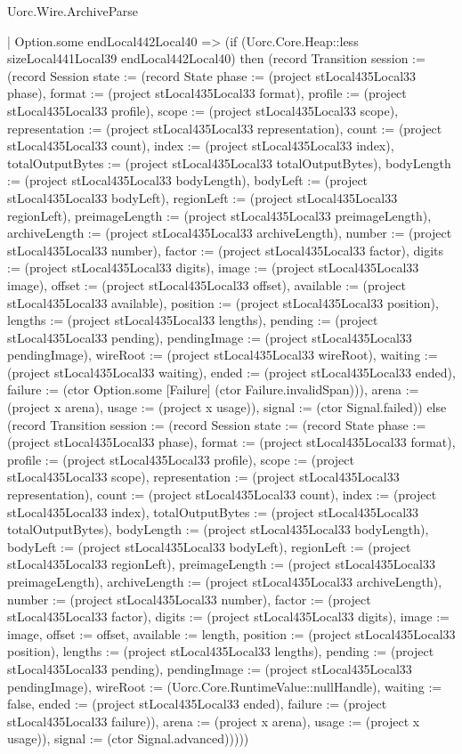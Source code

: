\begin{lexlean}{Uorc.Wire.ArchiveParse}
\begin{semanticmodule}
{            | Option.some endLocal442Local40 => (if (Uorc.Core.Heap::less sizeLocal441Local39 endLocal442Local40) then (record Transition {session := (record Session {state := (record State {phase := (project stLocal435Local33 phase), format := (project stLocal435Local33 format), profile := (project stLocal435Local33 profile), scope := (project stLocal435Local33 scope), representation := (project stLocal435Local33 representation), count := (project stLocal435Local33 count), index := (project stLocal435Local33 index), totalOutputBytes := (project stLocal435Local33 totalOutputBytes), bodyLength := (project stLocal435Local33 bodyLength), bodyLeft := (project stLocal435Local33 bodyLeft), regionLeft := (project stLocal435Local33 regionLeft), preimageLength := (project stLocal435Local33 preimageLength), archiveLength := (project stLocal435Local33 archiveLength), number := (project stLocal435Local33 number), factor := (project stLocal435Local33 factor), digits := (project stLocal435Local33 digits), image := (project stLocal435Local33 image), offset := (project stLocal435Local33 offset), available := (project stLocal435Local33 available), position := (project stLocal435Local33 position), lengths := (project stLocal435Local33 lengths), pending := (project stLocal435Local33 pending), pendingImage := (project stLocal435Local33 pendingImage), wireRoot := (project stLocal435Local33 wireRoot), waiting := (project stLocal435Local33 waiting), ended := (project stLocal435Local33 ended), failure := (ctor Option.some [Failure] (ctor Failure.invalidSpan))}), arena := (project x arena), usage := (project x usage)}), signal := (ctor Signal.failed)}) else (record Transition {session := (record Session {state := (record State {phase := (project stLocal435Local33 phase), format := (project stLocal435Local33 format), profile := (project stLocal435Local33 profile), scope := (project stLocal435Local33 scope), representation := (project stLocal435Local33 representation), count := (project stLocal435Local33 count), index := (project stLocal435Local33 index), totalOutputBytes := (project stLocal435Local33 totalOutputBytes), bodyLength := (project stLocal435Local33 bodyLength), bodyLeft := (project stLocal435Local33 bodyLeft), regionLeft := (project stLocal435Local33 regionLeft), preimageLength := (project stLocal435Local33 preimageLength), archiveLength := (project stLocal435Local33 archiveLength), number := (project stLocal435Local33 number), factor := (project stLocal435Local33 factor), digits := (project stLocal435Local33 digits), image := image, offset := offset, available := length, position := (project stLocal435Local33 position), lengths := (project stLocal435Local33 lengths), pending := (project stLocal435Local33 pending), pendingImage := (project stLocal435Local33 pendingImage), wireRoot := (Uorc.Core.RuntimeValue::nullHandle), waiting := false, ended := (project stLocal435Local33 ended), failure := (project stLocal435Local33 failure)}), arena := (project x arena), usage := (project x usage)}), signal := (ctor Signal.advanced)}))))
}
\end{semanticmodule}
\end{lexlean}
